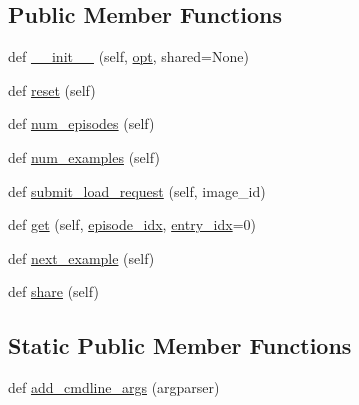 \subsection*{Public Member Functions}
\begin{DoxyCompactItemize}
\item 
def \hyperlink{classparlai_1_1tasks_1_1personality__captions_1_1agents_1_1PersonalityCaptionsTeacher_a629424710e209cb59e97404a313a97a8}{\+\_\+\+\_\+init\+\_\+\+\_\+} (self, \hyperlink{classparlai_1_1tasks_1_1personality__captions_1_1agents_1_1PersonalityCaptionsTeacher_a963e0c28dd614d0524fbfbad05fd8300}{opt}, shared=None)
\item 
def \hyperlink{classparlai_1_1tasks_1_1personality__captions_1_1agents_1_1PersonalityCaptionsTeacher_aeda2cb1016f17087749b578e898667b4}{reset} (self)
\item 
def \hyperlink{classparlai_1_1tasks_1_1personality__captions_1_1agents_1_1PersonalityCaptionsTeacher_a4d6d5ae65fc9d19ad7d847dbfd106427}{num\+\_\+episodes} (self)
\item 
def \hyperlink{classparlai_1_1tasks_1_1personality__captions_1_1agents_1_1PersonalityCaptionsTeacher_aa19ecea79bceee398eafd3a903e67349}{num\+\_\+examples} (self)
\item 
def \hyperlink{classparlai_1_1tasks_1_1personality__captions_1_1agents_1_1PersonalityCaptionsTeacher_a8b15a0281c0e15c0f4af16da820f7a52}{submit\+\_\+load\+\_\+request} (self, image\+\_\+id)
\item 
def \hyperlink{classparlai_1_1tasks_1_1personality__captions_1_1agents_1_1PersonalityCaptionsTeacher_a2f146ae93a6b1f19e570ef7aa8950c1b}{get} (self, \hyperlink{classparlai_1_1core_1_1teachers_1_1FixedDialogTeacher_afd4ebab8063eb42d182d30a1a41f133e}{episode\+\_\+idx}, \hyperlink{classparlai_1_1core_1_1teachers_1_1FixedDialogTeacher_ae3201b15f3c3b46a2f3511bad9b43e7d}{entry\+\_\+idx}=0)
\item 
def \hyperlink{classparlai_1_1tasks_1_1personality__captions_1_1agents_1_1PersonalityCaptionsTeacher_ace67289d386996e9dab37cc9fcca55b4}{next\+\_\+example} (self)
\item 
def \hyperlink{classparlai_1_1tasks_1_1personality__captions_1_1agents_1_1PersonalityCaptionsTeacher_aa00e8527a9f8dc2b42e37082fc0922d4}{share} (self)
\end{DoxyCompactItemize}
\subsection*{Static Public Member Functions}
\begin{DoxyCompactItemize}
\item 
def \hyperlink{classparlai_1_1tasks_1_1personality__captions_1_1agents_1_1PersonalityCaptionsTeacher_a2207d2726eb0d6e8d8713b9c0c45a961}{add\+\_\+cmdline\+\_\+args} (argparser)
\end{DoxyCompactItemize}
